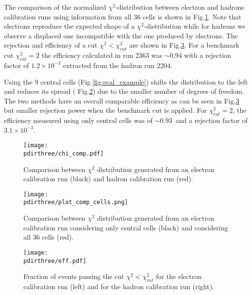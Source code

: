The comparison of the normalized $\chi^2$-distribution between
electron and hadrons calibration runs using information from all 36
cells is shown in Fig.\ref{fig:chi2}. Note that electrons reproduce
the expected shape of a $\chi^2$-distribution while for hadrons we
observe a displaced one incompatible with the one produced by
electrons.  The rejection and efficiency of a cut
$\chi^2 < \chi^2_{cut}$ are shown in Fig.\ref{fig:eff}. For
a benchmark cut $\chi^2_{cut} = 2$ the efficiency calculated in run 2363
was $\sim 0.94$ with a rejection factor of $1.2\times 10^{-3}$
extracted from the hadron run 2204.

Using the 9 central cells (Fig.\ref{fig:ecal_example}) shifts the distribution
to the left and reduces its spread ( Fig.\ref{fig:chi}) due to the
smaller number of degrees of freedom. The two methods have an overall
comparable efficiency as can be seen in Fig.\ref{fig:eff} but smaller
rejection power when the benchmark cut is applied.  For $\chi^2_{cut}=$2, the efficiency measured using only
central cells was of $\sim 0.93$\ and a rejection factor of $3.1\times 10^{-3}$.


\begin{figure}[h!]
  \begin{center}
    \texttt{[image: \\pdirthree/chi\_comp.pdf]}
  \end{center}
  \caption[Comparison between $\chi^2$ distribution, electron and hadron calibration run]{Comparison between $\chi^2$ distribution generated from an electron calibration run (black) and hadron calibration run (red).}
  \label{fig:chi2}
\end{figure}

\begin{figure}[h!]
  \begin{center}
    \texttt{[image: \\pdirthree/plot\_comp\_cells.png]}
  \end{center}
  \caption[Comparison between $\chi^2$ distribution for different ECAL configurations]{Comparison between $\chi^2$ distribution generated from an electron calibration run considering only central cells (black) and considering all 36 cells (red).}
  \label{fig:chi}
\end{figure}

\begin{figure}[h!]
  \begin{center}
    \texttt{[image: \\pdirthree/eff.pdf]}
  \end{center}
  \caption[Fraction of events passing the $\chi^2$ cut]{Fraction of events passing the cut $\chi^2 < \chi^2_{cut}$
    for the electron calibration run (left) and for the hadron calibration run (right).}
  \label{fig:eff}
\end{figure}

